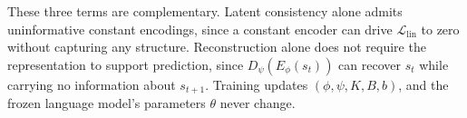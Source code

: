 These three terms are complementary. Latent consistency alone admits
uninformative constant encodings, since a constant encoder can drive
$\mathcal{L}_{\mathrm{lin}}$ to zero without capturing any structure.
Reconstruction alone does not require the representation to support
prediction, since $D_{\psi}(E_{\phi}(s_t))$ can recover $s_t$ while
carrying no information about $s_{t+1}$. Training updates
$(\phi,\psi,K,B,b)$, and the frozen language model's parameters
$\theta$ never change.

